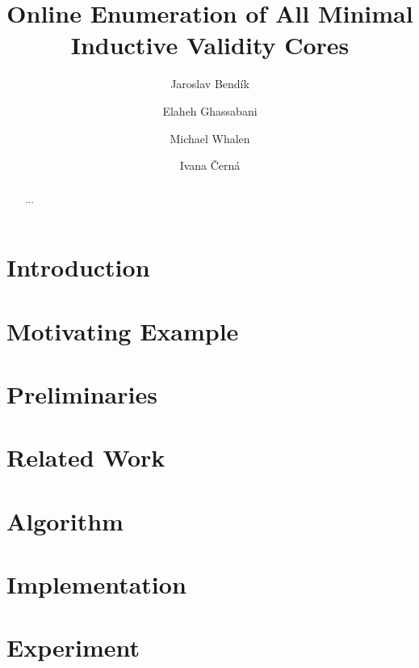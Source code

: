 \documentclass{llncs}
\begin{document}
\title{Online Enumeration of All Minimal Inductive Validity Cores}

\author{Jaroslav Bend\'ik 
	\and Elaheh Ghassabani
	\and Michael Whalen
	\and Ivana \v Cern\'a
}




\maketitle    
\begin{abstract} 
...
\end{abstract} 
 
 
 
\section{Introduction}
\label{sec:intro}



\section{Motivating Example}
\label{sec:mot-example}



\section{Preliminaries}
\label{sec:preliminaries}



\section{Related Work}
\label{sec:related-work}



\section{Algorithm}
\label{sec:algorithm}



\section{Implementation}
\label{sec:impl}



\section{Experiment}
\label{sec:experiment}

\end{document}
